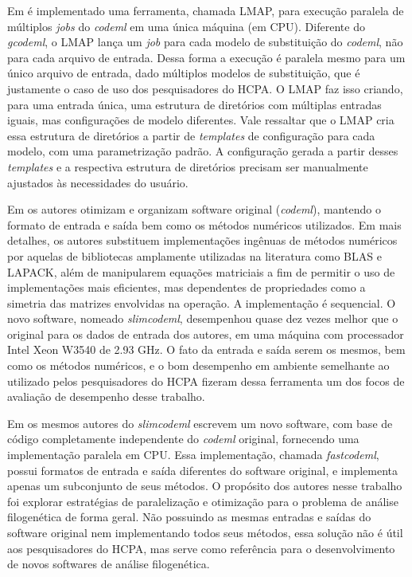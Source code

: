\documentclass[cic,tc]{iiufrgs}
\begin{document}
Em \cite{maldonado2016lmap} é implementado uma
ferramenta, chamada LMAP, para execução paralela de múltiplos \textit{jobs} do
\textit{codeml} em uma única máquina (em CPU). Diferente do \textit{gcodeml}, o LMAP lança um
\textit{job} para cada modelo de substituição do \textit{codeml}, não para
cada arquivo de entrada. Dessa forma a execução é paralela mesmo para um único
arquivo de entrada, dado múltiplos modelos de substituição, que é
justamente o caso de uso dos pesquisadores do HCPA. O LMAP faz isso criando,
para uma entrada única, uma estrutura de diretórios com múltiplas entradas
iguais, mas configurações de modelo diferentes. Vale ressaltar que o LMAP cria
essa estrutura de diretórios a partir de \textit{templates} de configuração
para cada modelo, com uma parametrização padrão. A configuração gerada a partir
desses \textit{templates} e a respectiva estrutura de diretórios precisam ser
manualmente ajustados às necessidades do usuário.

Em \cite{schabauer2012slimcodeml} os autores otimizam e organizam software
original (\textit{codeml}), mantendo o formato de entrada e saída bem como os métodos
numéricos utilizados. Em mais detalhes, os autores substituem implementações
ingênuas de métodos numéricos por aquelas de bibliotecas amplamente utilizadas
na literatura como BLAS e LAPACK, além de manipularem equações matriciais a fim
de permitir o uso de implementações mais eficientes, mas dependentes de
propriedades como a simetria das matrizes envolvidas na operação. A
implementação é sequencial. O novo software, nomeado \textit{slimcodeml}, desempenhou
quase dez vezes melhor que o original para os dados de entrada dos autores, em
uma máquina com processador Intel Xeon W3540 de 2.93 GHz. O fato da entrada e
saída serem os mesmos, bem como os métodos numéricos, e o bom desempenho em
ambiente semelhante ao utilizado pelos pesquisadores do HCPA fizeram dessa
ferramenta um dos focos de avaliação de desempenho desse trabalho.

Em \cite{valle2014optimization} os mesmos autores do \textit{slimcodeml} escrevem um
novo software, com base de código completamente independente do \textit{codeml}
original, fornecendo uma implementação paralela em CPU. Essa implementação,
chamada \textit{fastcodeml}, possui formatos de entrada e saída diferentes do software
original, e implementa apenas um subconjunto de seus métodos. O propósito dos
autores nesse trabalho foi explorar estratégias de paralelização e otimização
para o problema de análise filogenética de forma geral. Não possuindo as mesmas
entradas e saídas do software original nem implementando todos seus métodos,
essa solução não é útil aos pesquisadores do HCPA, mas serve como referência
para o desenvolvimento de novos softwares de análise filogenética.
\end{document}
